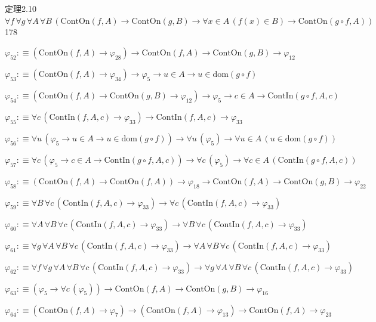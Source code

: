 \begin{fullproof}{定理2.10}{$\forall f\,\forall g\,\forall A\,\forall B\,(\mathrm{ContOn}(f,A) \to \mathrm{ContOn}(g,B) \to \forall x \in A\,(f(x) \in B) \to \mathrm{ContOn}(g \circ f,A))$}{178}
\begin{abbrevlist}
\item $\varphi_{52} :\equiv (\mathrm{ContOn}(f,A) \to \varphi_{28}) \to \mathrm{ContOn}(f,A) \to \mathrm{ContOn}(g,B) \to \varphi_{12}$
\item $\varphi_{53} :\equiv (\mathrm{ContOn}(f,A) \to \varphi_{34}) \to \varphi_{5} \to u \in A \to u \in \mathrm{dom}(g \circ f)$
\item $\varphi_{54} :\equiv (\mathrm{ContOn}(f,A) \to \mathrm{ContOn}(g,B) \to \varphi_{12}) \to \varphi_{5} \to c \in A \to \mathrm{ContIn}(g \circ f,A,c)$
\item $\varphi_{55} :\equiv \forall c\,(\mathrm{ContIn}(f,A,c) \to \varphi_{33}) \to \mathrm{ContIn}(f,A,c) \to \varphi_{33}$
\item $\varphi_{56} :\equiv \forall u\,(\varphi_{5} \to u \in A \to u \in \mathrm{dom}(g \circ f)) \to \forall u\,(\varphi_{5}) \to \forall u \in A\,(u \in \mathrm{dom}(g \circ f))$
\item $\varphi_{57} :\equiv \forall c\,(\varphi_{5} \to c \in A \to \mathrm{ContIn}(g \circ f,A,c)) \to \forall c\,(\varphi_{5}) \to \forall c \in A\,(\mathrm{ContIn}(g \circ f,A,c))$
\item $\varphi_{58} :\equiv (\mathrm{ContOn}(f,A) \to \mathrm{ContOn}(f,A)) \to \varphi_{18} \to \mathrm{ContOn}(f,A) \to \mathrm{ContOn}(g,B) \to \varphi_{22}$
\item $\varphi_{59} :\equiv \forall B\,\forall c\,(\mathrm{ContIn}(f,A,c) \to \varphi_{33}) \to \forall c\,(\mathrm{ContIn}(f,A,c) \to \varphi_{33})$
\item $\varphi_{60} :\equiv \forall A\,\forall B\,\forall c\,(\mathrm{ContIn}(f,A,c) \to \varphi_{33}) \to \forall B\,\forall c\,(\mathrm{ContIn}(f,A,c) \to \varphi_{33})$
\item $\varphi_{61} :\equiv \forall g\,\forall A\,\forall B\,\forall c\,(\mathrm{ContIn}(f,A,c) \to \varphi_{33}) \to \forall A\,\forall B\,\forall c\,(\mathrm{ContIn}(f,A,c) \to \varphi_{33})$
\item $\varphi_{62} :\equiv \forall f\,\forall g\,\forall A\,\forall B\,\forall c\,(\mathrm{ContIn}(f,A,c) \to \varphi_{33}) \to \forall g\,\forall A\,\forall B\,\forall c\,(\mathrm{ContIn}(f,A,c) \to \varphi_{33})$
\item $\varphi_{63} :\equiv (\varphi_{5} \to \forall c\,(\varphi_{5})) \to \mathrm{ContOn}(f,A) \to \mathrm{ContOn}(g,B) \to \varphi_{16}$
\item $\varphi_{64} :\equiv (\mathrm{ContOn}(f,A) \to \varphi_{7}) \to (\mathrm{ContOn}(f,A) \to \varphi_{13}) \to \mathrm{ContOn}(f,A) \to \varphi_{23}$

\end{abbrevlist}
\end{fullproof}
